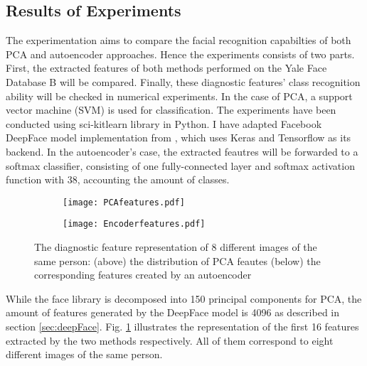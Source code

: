 \subsection{Results of Experiments}
The experimentation aims to compare the facial recognition capabilties of both
PCA and autoencoder approaches. Hence the experiments consists of two parts.
First, the extracted features of both methods performed on the Yale Face
Database B will be compared. Finally, these diagnostic features' class
recognition ability will be checked in numerical experiments. In the case of
PCA, a support vector machine (SVM) is used for classification. The experiments
have been conducted using sci-kitlearn \cite{sk} library in Python. I have
adapted Facebook DeepFace model implementation from
\cite{serengil2017tensorflow101}, which uses Keras \cite{chollet2015keras} and
Tensorflow \cite{tensorflow} as its backend. In the autoencoder's case, the
extracted feautres will be forwarded to a softmax classifier, consisting of one
fully-connected layer and softmax activation function with 38, accounting the
amount of classes.

\begin{figure}[h]
  \begin{subfigure}{}
    \texttt{[image: PCAfeatures.pdf]}
  \end{subfigure}

  \begin{subfigure}{}
    \texttt{[image: Encoderfeatures.pdf]}
  \end{subfigure}

  \caption{The diagnostic feature representation of 8 different images of the same person: (above) the distribution of PCA feautes (below) the corresponding features created by an autoencoder}
  \label{features}
\end{figure}

While the face library is decomposed into 150 principal components for PCA, the
amount of features generated by the DeepFace model is 4096 as described in
section \ref{sec:deepFace}. Fig. \ref{features} illustrates the representation
of the first 16 features extracted by the two methods respectively. All of them
correspond to eight different images of the same person. 


